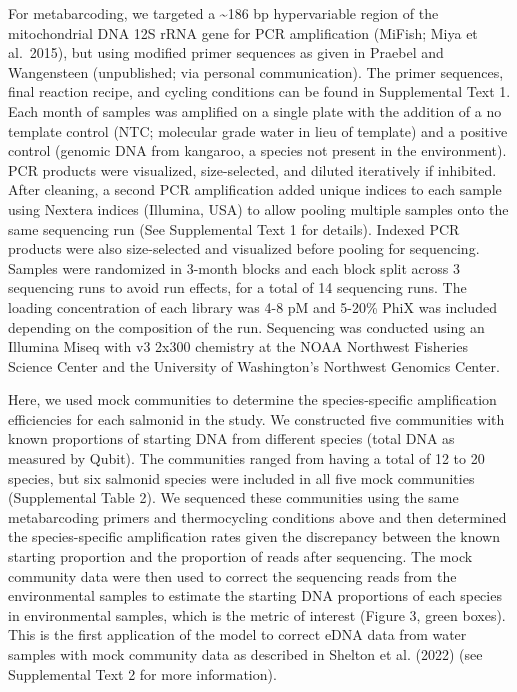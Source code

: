 \documentclass[
]{article}
\begin{document}
For metabarcoding, we targeted a \textasciitilde186 bp hypervariable
region of the mitochondrial DNA 12S rRNA gene for PCR amplification
(MiFish; Miya et al.~2015), but using modified primer sequences as given
in Praebel and Wangensteen (unpublished; via personal communication).
The primer sequences, final reaction recipe, and cycling conditions can
be found in Supplemental Text 1. Each month of samples was amplified on
a single plate with the addition of a no template control (NTC;
molecular grade water in lieu of template) and a positive control
(genomic DNA from kangaroo, a species not present in the environment).
PCR products were visualized, size-selected, and diluted iteratively if
inhibited. After cleaning, a second PCR amplification added unique
indices to each sample using Nextera indices (Illumina, USA) to allow
pooling multiple samples onto the same sequencing run (See Supplemental
Text 1 for details). Indexed PCR products were also size-selected and
visualized before pooling for sequencing. Samples were randomized in
3-month blocks and each block split across 3 sequencing runs to avoid
run effects, for a total of 14 sequencing runs. The loading
concentration of each library was 4-8 pM and 5-20\% PhiX was included
depending on the composition of the run. Sequencing was conducted using
an Illumina Miseq with v3 2x300 chemistry at the NOAA Northwest
Fisheries Science Center and the University of Washington's Northwest
Genomics Center.

Here, we used mock communities to determine the species-specific
amplification efficiencies for each salmonid in the study. We
constructed five communities with known proportions of starting DNA from
different species (total DNA as measured by Qubit). The communities
ranged from having a total of 12 to 20 species, but six salmonid species
were included in all five mock communities (Supplemental Table 2). We
sequenced these communities using the same metabarcoding primers and
thermocycling conditions above and then determined the species-specific
amplification rates given the discrepancy between the known starting
proportion and the proportion of reads after sequencing. The mock
community data were then used to correct the sequencing reads from the
environmental samples to estimate the starting DNA proportions of each
species in environmental samples, which is the metric of interest
(Figure 3, green boxes). This is the first application of the model to
correct eDNA data from water samples with mock community data as
described in Shelton et al. (2022) (see Supplemental Text 2 for more
information).
\end{document}
